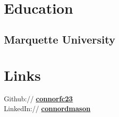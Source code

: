 \documentclass[letterpaper]{deedy-resume} %
\begin{document}




\begin{minipage}[t]{0.33\textwidth} %


\section{Education} 

\subsection{Marquette University}

\sectionspace %


\section{Links} 

Github:// \href{https://github.com/connorfc23}{\bf connorfc23} \\
LinkedIn:// \href{https://www.linkedin.com/in/connordmason}{\bf connordmason} \\

\sectionspace %



\end{minipage}
\end{document}
